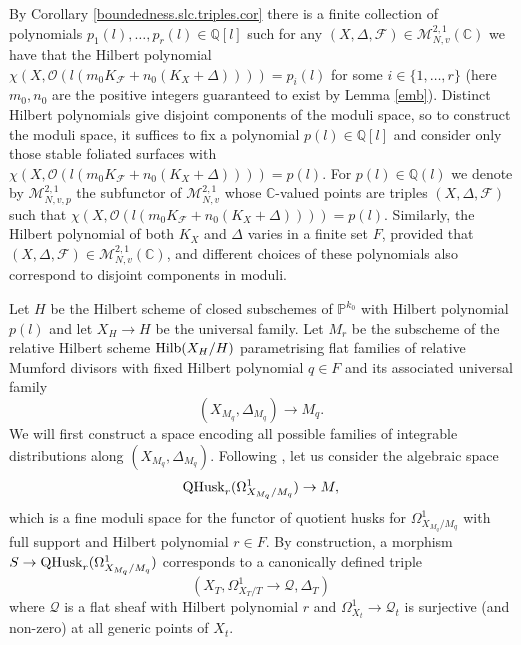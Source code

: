 \documentclass[12pt, a4paper]{amsart}
\newcommand\CC{\mathbb{C}}
\newcommand\PP{\mathbb{P}}
\newcommand\Q{\mathcal{Q}}
\newcommand\FF{\mathcal{F}}
\theoremstyle{definition}
\theoremstyle{named}
\begin{document}
By Corollary \ref{boundedness.slc.triples.cor} there is a finite collection of polynomials $p_1(l), \dots, p_r(l) \in \mathbb Q[l]$ such for any $(X, \Delta, \mathcal F) \in \mathcal M^{2, 1}_{N, v}(\mathbb C)$ we have that the Hilbert polynomial $\chi(X, \mathcal O(l(m_0K_{\mathcal F}+n_0(K_X+\Delta)))) = p_i(l)$ for some $i \in \{1, \dots, r\}$
(here $m_0, n_0$ are the positive integers guaranteed to exist by Lemma \ref{emb}). Distinct Hilbert polynomials give disjoint components of the moduli space, so to construct the moduli space, it suffices to fix a polynomial $p(l) \in \mathbb Q[l]$ and consider only those stable foliated surfaces with 
$\chi(X, \mathcal O(l(m_0K_{\mathcal F}+n_0(K_X+\Delta)))) = p(l)$.  For $p(l) \in \mathbb Q(l)$ we denote 
by $\mathcal M^{2, 1}_{N, v, p}$ the subfunctor of $\mathcal M^{2, 1}_{N, v}$ whose $\mathbb C$-valued points are 
triples $(X, \Delta, \mathcal F)$ such that $\chi(X, \mathcal O(l(m_0K_{\mathcal F}+n_0(K_X+\Delta)))) = p(l)$. 
    Similarly, the Hilbert polynomial of both $K_X$ and $\Delta$ varies in a finite set $F$, provided that $(X,\Delta,\FF)\in \mathcal M^{2, 1}_{N, v}(\CC)$, and  different choices of these polynomials also correspond to disjoint components in moduli.

Let $H$ be the Hilbert scheme of closed subschemes of $\PP^{k_0}$ with Hilbert polynomial $p(l)$ and let $X_H \to H$ be the universal family.
Let $M_r$ be the subscheme of the relative Hilbert scheme ${\rm Hilb}(X_H/H)$ parametrising flat families of relative Mumford divisors with fixed Hilbert polynomial $q\in F$ and its associated universal family
$$ (X_{M_q},\Delta_{M_q})\to M_q.$$
We will first construct a space encoding all possible families of integrable distributions along $(X_{M_q},\Delta_{M_q})$. 
Following \cite[Chapter 9]{modbook}, let us consider the algebraic space 
$${\rm QHusk}_r(\Omega^1_{X_{M_q}/ {M_q}})\to M,$$ which is a fine moduli space for the functor of quotient husks for $\Omega^1_{X_{M_q}/{M_q}}$ with full support and Hilbert polynomial $r\in F$. By construction, a morphism $S\to {\rm QHusk}_r(\Omega^1_{X_{M_q}/{M_q}})$ corresponds to a canonically defined triple 
$$(X_T,\Omega^1_{X_T/T}\to \Q ,\Delta_T)$$ 
where $\Q$ is a flat sheaf with Hilbert polynomial $r$ and $\Omega^1_{X_t}\to \Q_t$ is surjective (and non-zero) at all generic points of $X_t$.
\end{document}
